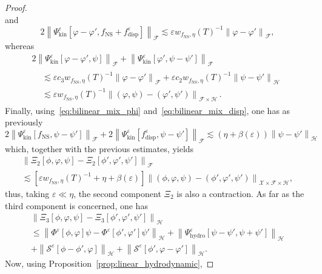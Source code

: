 \documentclass[AHL,Unicode,longabstracts,published]{cedram}
\newcommand{\ns}{\mathrm{NS}}
\newcommand{\hyd}{\mathrm{hydro}}
\newcommand{\kin}{\mathrm{kin}}
\newcommand{\disp}{\mathrm{disp}}
\renewcommand{\SS}{\mathcal{S}}
\newcommand{\FFF}{\mathscr{F}}
\newcommand{\HHH}{\mathscr{H}}
\newcommand{\GGG}{\mathscr{X}}
\newcommand{\SSSs}{\HHH}
\newcommand{\SSSl}{\GGG}
\newcommand{\SSSm}{\FFF}
\renewcommand*\le{\leqslant}
\newcommand*\eps{{\varepsilon}}
\begin{document}
\begin{proof}
\[\]
and
\[
2 \left\| \Psi^\eps_\kin [\varphi - \varphi', f_\ns + f^\eps_\disp] \right\|_{ \SSSm } \lesssim \eps w_{f_\ns, \eta}(T)^{-1} \left\| \varphi - \varphi' \right\|_{ \SSSm },
\]
whereas
\begin{multline*}
2 \left\| \Psi^\eps_\kin \left[\varphi -  \varphi', \psi\right] \right\|_{ \SSSm } + \left\| \Psi^\eps_\kin \left[\varphi', \psi - \psi'\right] \right\|_{ \SSSm } \\
\begin{aligned}
& \lesssim \eps c_3 w_{f_\ns, \eta}(T)^{-1} \left\| \varphi - \varphi' \right\|_{ \SSSm } + \eps c_2 w_{f_\ns, \eta}(T)^{-1} \left\| \psi - \psi' \right\|_{ \SSSs } \\
& \lesssim \eps w_{f_\ns, \eta}(T)^{-1}\left\| (\varphi, \psi) - (\varphi', \psi') \right\|_{ \SSSm \times \SSSs }\,.
\end{aligned}
\end{multline*}
Finally, using~\eqref{eq:bilinear_mix_phi} and~\eqref{eq:bilinear_mix_disp}, one has as previously
\[
2 \left\| \Psi^\eps_\kin \left[f_\ns, \psi - \psi'\right] \right\|_{ \SSSm } + 2 \left\| \Psi^\eps_\kin\left[f^\eps_\disp, \psi - \psi'\right] \right\|_{ \SSSm } \lesssim \left(\eta + \beta(\eps)\right) \left\| \psi - \psi' \right\|_{ \SSSs }\,
\]
which, together with the previous estimates, yields
\begin{multline*}
\left\| \Xi_2\left[\phi,  \varphi, \psi\right] - \Xi_2\left[\phi', \varphi', \psi'\right] \right\|_{ \SSSm } \\
 \lesssim \left[\eps w_{ f_\ns, \eta }(T)^{-1} +\eta + \beta(\eps)\right]\left\| (\phi, \varphi, \psi) - (\phi', \varphi', \psi') \right\|_{ \SSSl \times \SSSm \times \SSSs },
\end{multline*}
thus, taking $\eps \ll \eta$, the second component $\Xi_2$ is also a contraction. As far as the third component is concerned, one has
\begin{multline*}
\left\| \Xi_3\left[\phi, \varphi, \psi\right]  - \Xi_3\left[\phi', \varphi', \psi'\right] \right\|_{ \SSSs } \\
 \le \left\| \Phi^\eps\left[\phi, \varphi\right] \psi - \Phi^\eps\left[\phi', \varphi'\right] \psi' \right\|_{ \SSSs } + \left\| \Psi^\eps_\hyd\left[\psi - \psi', \psi + \psi'\right] \right\|_{ \SSSs }\\
+ \left\| \SS^\eps\left[\phi-\phi',\varphi\right]\right\|_{\SSSs} + \left\| \SS^\eps\left[\phi',\varphi-\varphi'\right]\right\|_{\SSSs}.
\end{multline*}
Now, using Proposition~\ref{prop:linear_hydrodynamic},

\end{proof}
\end{document}
